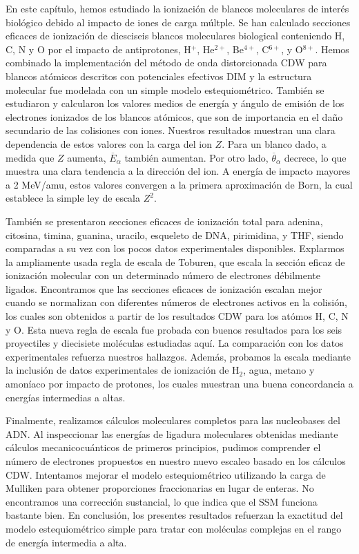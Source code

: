 En este capítulo, hemos estudiado la ionización de blancos moleculares 
de interés biológico debido al impacto de iones de carga múltple. Se han
calculado secciones eficaces de ionización de diesciseis blancos 
moleculares biological conteniendo H, C, N y O por el impacto de
antiprotones, H$^{+}$, He$^{2+}$, Be$^{4+}$, C$^{6+}$, y O$^{8+}$. 
Hemos combinado la implementación del método de onda distorcionada
CDW para blancos atómicos descritos con potenciales efectivos DIM y la 
estructura molecular fue modelada con un simple modelo estequiométrico.
También se estudiaron y calcularon los valores medios de energía y 
ángulo de emisión de los electrones ionizados de los blancos atómicos, 
que son de importancia en el daño secundario de las colisiones con iones.
Nuestros resultados muestran una clara dependencia de estos valores con 
la carga del ion $Z$. Para un blanco dado, a medida que $Z$ aumenta,
$\overline{E}_{\alpha}$ también aumentan. Por otro lado, 
$\overline{\theta}_{\alpha}$ decrece, lo que muestra una clara tendencia 
a la dirección del ion. A energía de impacto mayores a 2 MeV/amu, estos
valores convergen a la primera aproximación de Born, la cual establece 
la simple ley de escala $Z^{2}$. 

También se presentaron secciones eficaces de ionización total
para adenina, citosina, timina, guanina, uracilo, esqueleto de DNA, 
pirimidina, y THF, siendo comparadas a su vez con los pocos datos
experimentales disponibles. Explarmos la ampliamente usada regla de 
escala de Toburen, que escala la sección eficaz de ionización molecular 
con un determinado número de electrones débilmente ligados.
Encontramos que las secciones eficaces de ionización escalan
mejor cuando se normalizan con diferentes números de electrones activos
en la colisión, los cuales son obtenidos a partir de los resultados CDW
para los atómos H, C, N y O. Esta nueva regla de escala fue 
probada con buenos resultados para los seis proyectiles y diecisiete 
moléculas estudiadas aquí. La comparación con los datos experimentales 
refuerza nuestros hallazgos. Además, probamos la escala mediante la 
inclusión de datos experimentales de ionización de H$_2$, agua, metano 
y amoníaco por impacto de protones, los cuales muestran una buena 
concordancia a energías intermedias a altas.

Finalmente, realizamos cálculos moleculares completos para las 
nucleobases del ADN. Al inspeccionar las energías de ligadura 
moleculares obtenidas mediante cálculos mecanicocuánticos de primeros 
principios, pudimos comprender el número de electrones propuestos en 
nuestro nuevo escaleo basado en los cálculos CDW. Intentamos mejorar el 
modelo estequiométrico utilizando la carga de Mulliken para obtener 
proporciones fraccionarias en lugar de enteras. No encontramos una 
corrección sustancial, lo que indica que el SSM funciona bastante bien. 
En conclusión, los presentes resultados refuerzan la exactitud del modelo
estequiométrico simple para tratar con moléculas complejas en el rango 
de energía intermedia a alta. 



